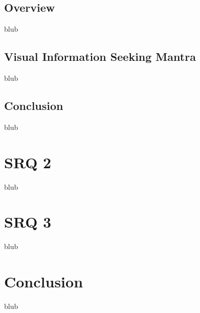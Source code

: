 \subsection{Overview}

blub




\subsection{Visual Information Seeking Mantra}

blub




\subsection{Conclusion}

blub




\section{SRQ 2}

\label{SectionLiteratureReviewSRQ2}

blub




\section{SRQ 3}

\label{SectionLiteratureReviewSRQ3}

blub





\section{Conclusion}

\label{SectionLiteratureReviewConclusion}

blub

